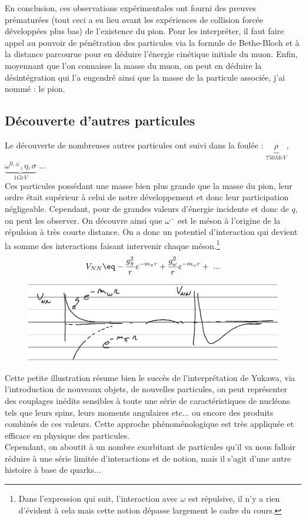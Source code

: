 En conclusion, ces observations expérimentales ont fourni des preuves prématurées (tout ceci a eu lieu avant les expériences de collision forcée développées plus bas) de l'existence du pion. Pour les interpréter, il faut faire appel au pouvoir de pénétration des particules via la formule de Bethe-Bloch et à la distance parcourue pour en déduire l'énergie cinétique initiale du muon. Enfin, moyennant que l'on connaisse la masse du muon, on peut en déduire la désintégration qui l'a engendré ainsi que la masse de la particule associée, j'ai nommé : le pion.

\subsection{Découverte d'autres particules}


Le découverte de nombreuses autres particules ont suivi dans la foulée : $\underbrace{\rho}_{750MeV}$, $\underbrace{\omega^{0,\pm},\eta, \sigma}_{1GeV}$ ...\\
Ces particules possédant une masse bien plus grande que la masse du pion, leur ordre était supérieur à celui de notre développement et donc leur participation négligeable. Cependant, pour de grandes valeurs d'énergie incidente et donc de $q$, on peut les observer. On découvre ainsi que $\omega^-$ est le méson à l'origine de la répulsion à très courte distance. On a donc un potentiel d'interaction qui devient la somme des interactions faisant intervenir chaque méson.\footnote{Dans l'expression qui suit, l'interaction avec $\omega$ est répulsive, il n'y a rien d'évident à cela mais cette notion dépasse largement le cadre du cours.}
\begin{equation*}
    V_{NN}\eq - \frac{g^2_\pi}{r}e^{-m_\pi r} +  \frac{g^2_\omega}{r}e^{-m_\omega r} +\ ...
\end{equation*}
\begin{figure}[H]
    \centering
    \includegraphics[scale = 0.8]{Images4/Potentiel NN.PNG}
\end{figure}
Cette petite illustration résume bien le succès de l'interprétation de Yukawa, via l'introduction de nouveaux objets, de nouvelles particules, on peut représenter des couplages inédits sensibles à toute une série de caractéristiques de nucléons tels que leurs spins, leurs moments angulaires etc... ou encore des produits combinés de ces valeurs. Cette approche phénoménologique est très appliquée et efficace en physique des particules.\\
Cependant, on aboutit à un nombre exorbitant de particules qu'il va nous falloir réduire à une série limitée d'interactions et de notion, mais il s'agit d'une autre histoire à base de quarks...
